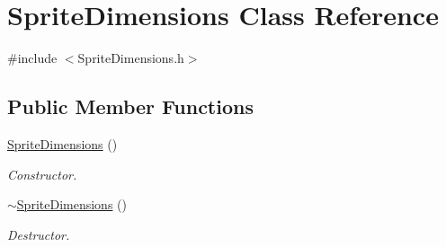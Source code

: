 \hypertarget{classSpriteDimensions}{\section{Sprite\-Dimensions Class Reference}
\label{classSpriteDimensions}
}


{\ttfamily \#include $<$Sprite\-Dimensions.\-h$>$}

\subsection*{Public Member Functions}
\begin{DoxyCompactItemize}
\item 
\hyperlink{classSpriteDimensions_a5ae560281c00f763641653b9e121614f}{Sprite\-Dimensions} ()
\begin{DoxyCompactList}\small\item\em Constructor. \end{DoxyCompactList}\item 
\hyperlink{classSpriteDimensions_a9309ef0f1d831d1ca4e1c65fda492c5f}{$\sim$\-Sprite\-Dimensions} ()
\begin{DoxyCompactList}\small\item\em Destructor. \end{DoxyCompactList}\end{DoxyCompactItemize}
